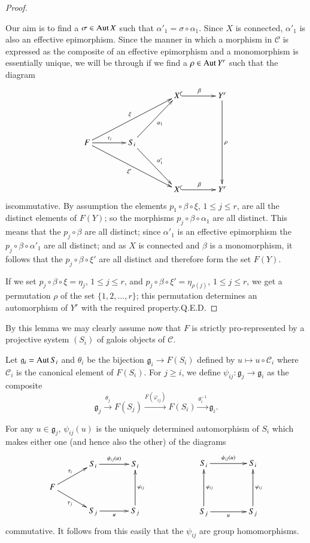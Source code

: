 \begin{proof}
\begin{itemize}
Our aim is to find a $\sigma \in\operatorname{Aut} X$ such that
$\alpha'_{1}=\sigma\circ \alpha_{1}$. Since $X$ is connected,
$\alpha'_{1}$ is also an effective epimorphism. Since the manner in
which a morphism in $\mathscr{C}$ is expressed as the composite of an
effective epimorphism and a monomorphism is essentially unique, we
will be through if we find a $\rho\in\operatorname{Aut} Y^{r}$ such that the diagram
\[
\xymatrix@C=1.4cm@R=1.5cm{
 & & X\ar@{^{(}->}[r]^{\beta} & Y^{r}\ar[dd]^{\rho}\\
F\ar[urr]^{\xi}\ar[r]^{\tau_{i}}\ar[drr]_{\xi'} & 
S_{i}\ar[dr]^{\alpha'_{1}}\ar[ur]_{\alpha_{1}} & & \\ 
 & & X\ar@{^{(}->}[r]^{\beta} & Y^{r}
}
\]
is\pageoriginale commutative. By assumption the elements $p_{1}\circ
\beta\circ \xi$, $1\leq j\leq r$, are all the distinct elements of
$F(Y)$; so the morphisms $p_{j}\circ \beta\circ\alpha_{1}$ are all
distinct. This means that the $p_{j}\circ\beta$ are all distinct;
since $\alpha'_{1}$ is an effective epimorphism the $p_{j}\circ
\beta\circ\alpha'_{1}$ are all distinct; and as $X$ is connected and
$\beta$ is a monomorphism, it follows that the $p_{j}\circ \beta\circ
\xi'$ are all distinct and therefore form the set $F(Y)$.
\end{itemize}

If we set $p_{j}\circ \beta\circ \xi =\eta_{j}$, $1\leq j\leq r$, and
$p_{j}\circ \beta\circ \xi'=\eta_{\rho(j)}$, $1\leq j\leq r$, we get a
permutation $\rho$ of the set $\{1,2,\ldots,r\}$; this permutation
determines an automorphism of $Y^{r}$ with the required
property.\hfill Q.E.D.
\end{proof}

By this lemma we may clearly assume now that $F$ is strictly
pro-represented by a projective system $(S_{i})$ of galois objects of
$\mathscr{C}$.

Let $\mathfrak{g}_{i}=\operatorname{Aut} S_{i}$ and $\theta_{i}$ be the bijection
$\mathfrak{g}_{i}\to F(S_{i})$ defined by $u\mapsto u\circ
\mathscr{C}_{i}$ where $\mathscr{C}_{i}$ is the canonical element of
$F(S_{i})$. For $j\geq i$, we define $\psi_{ij}:\mathfrak{g}_{j}\to
\mathfrak{g}_{i}$ as the composite 
$$
\mathfrak{g}_{j}\xrightarrow{\theta_{j}}F(S_{j})\xrightarrow{F(\varphi_{ij})}F(S_{i})\xrightarrow{\theta^{-1}_{i}}\mathfrak{g}_{i}. 
$$

For any $u\in \mathfrak{g}_{j}$, $\psi_{ij}(u)$ is the uniquely
determined automorphism of $S_{i}$ which makes either one (and hence
also the other) of the diagrams\pageoriginale
\[
\vcenter{\xymatrix@C=1.2cm@R=.5cm{
 & S_{i}\ar[r]^{\psi_{ij}(u)} & S_{i}\\
F\ar[ur]^{\tau_{i}}\ar[dr]_{\tau_{j}} & &\\
 & S_{j}\ar[r]_{u} & S_{j}\ar[uu]_{\varphi_{ij}}
}}
\qquad\qquad\qquad 
\vcenter{\xymatrix@=1.5cm{
S_{i}\ar[r]^{\psi_{ij}(u)} & S_{i}\\
S_{j}\ar[u]_{\varphi_{ij}}\ar[r]_{u} & S_{j}\ar[u]_{\varphi_{ij}}
}}
\]
commutative. It follows from this easily that the $\psi_{ij}$ are
group homomorphisms.

